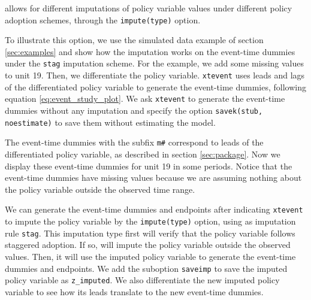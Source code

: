 \documentclass[bib]{./sty/statapress}
\begin{document}
\xtevent allows for different imputations of policy variable values under different policy adoption schemes, through the \texttt{impute(type)} option.

To illustrate this option, we use the simulated data example of section \ref{sec:examples} and show how the imputation works on the event-time dummies under the \texttt{stag} imputation scheme. For the example, we add some missing values to unit 19. Then, we differentiate the policy variable. \texttt{xtevent} uses leads and lags of the differentiated policy variable to generate the event-time dummies, following equation \eqref{eq:event_study_plot}. We ask \texttt{xtevent} to generate the event-time dummies without any imputation and specify the option \texttt{savek(stub, noestimate)} to save them without estimating the model.

\begin{stlog}
	\nullskip
\end{stlog}

The event-time dummies with the subfix \texttt{m\#} correspond to leads of the differentiated policy variable, as described in section \ref{sec:package}. Now we display these event-time dummies for unit 19 in some periods. Notice that the event-time dummies have missing values because we are assuming nothing about the policy variable outside the observed time range.

\begin{stlog}
	\nullskip
\end{stlog}

We can generate the event-time dummies and endpoints after indicating \texttt{xtevent} to impute the policy variable by the \texttt{impute(type)} option, using as imputation rule \texttt{stag}. This imputation type first will verify that the policy variable follows staggered adoption. If so, \xtevent will impute the policy variable outside the observed values. Then, it will use the imputed policy variable to generate the event-time dummies and endpoints. We add the suboption \texttt{saveimp} to save the imputed policy variable as \texttt{z\_imputed}. We also differentiate the new imputed policy variable to see how its leads translate to the new event-time dummies.

\begin{stlog}
	\nullskip
\end{stlog}
\end{document}
